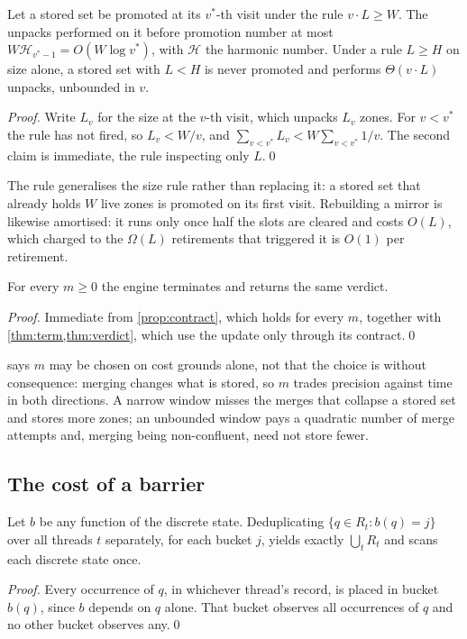 \begin{proposition}
\label{prop:mirrorwork}
Let a stored set be promoted at its $v^{*}$-th visit under the rule $v \cdot L
\ge W$.  The unpacks performed on it before promotion number at most $W
\mathcal{H}_{v^{*}-1} = O(W \log v^{*})$, with $\mathcal{H}$ the harmonic number.
Under a rule $L \ge H$ on size alone, a stored set with $L < H$ is never promoted
and performs $\Theta(v \cdot L)$ unpacks, unbounded in $v$.
\end{proposition}
\begin{proof}
Write $L_v$ for the size at the $v$-th visit, which unpacks $L_v$ zones.  For
$v < v^{*}$ the rule has not fired, so $L_v < W/v$, and $\sum_{v<v^{*}} L_v < W
\sum_{v<v^{*}} 1/v$.  The second claim is immediate, the rule inspecting only
$L$.\qed
\end{proof}

The rule generalises the size rule rather than replacing it: a stored set that
already holds $W$ live zones is promoted on its first visit.  Rebuilding a mirror
is likewise amortised: it runs only once half the slots are cleared and costs
$O(L)$, which charged to the $\Omega(L)$ retirements that triggered it is $O(1)$
per retirement.

\begin{proposition}\label{prop:window}
For every $m \ge 0$ the engine terminates and returns the same verdict.
\end{proposition}
\begin{proof}
Immediate from \cref{prop:contract}, which holds for every $m$, together with
\cref{thm:term,thm:verdict}, which use the update only through its contract.\qed
\end{proof}

 says $m$ may be chosen on cost grounds alone, not that the
choice is without consequence: merging changes what is stored, so $m$ trades
precision against time in both directions.  A narrow window misses the merges
that collapse a stored set and stores more zones; an unbounded window pays a
quadratic number of merge attempts and, merging being non-confluent, need not
store fewer.

\subsection{The cost of a barrier}\label{sec:barriercost}

\begin{proposition}\label{prop:bucket}
Let $b$ be any function of the discrete state.  Deduplicating $\{q \in R_t : b(q)
= j\}$ over all threads $t$ separately, for each bucket $j$, yields exactly
$\bigcup_t R_t$ and scans each discrete state once.
\end{proposition}
\begin{proof}
Every occurrence of $q$, in whichever thread's record, is placed in bucket
$b(q)$, since $b$ depends on $q$ alone.  That bucket observes all occurrences of
$q$ and no other bucket observes any.\qed
\end{proof}

